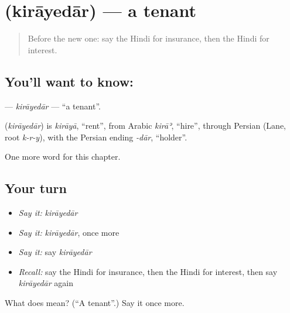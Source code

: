 \section[\texorpdfstring{\hi{किरायेदार} (kirāyedār)}{किरायेदार (kirāyedār)}]{ (kirāyedār) — a tenant}

\label{lesson:HI-C271-kirayedar}



\begin{quote}
Before the new one: say the Hindi for insurance, then the Hindi for interest.
\end{quote}

\subsection*{You'll want to know: }
\textbf{} — \emph{kirāyedār} — \textquotedblleft{}a tenant\textquotedblright{}.

\begin{cousinweb}
\textbf{} (\emph{kirāyedār}) is \emph{kirāyā}, \textquotedblleft{}rent\textquotedblright{}, from Arabic \emph{kirāʾ}, \textquotedblleft{}hire\textquotedblright{}, through Persian (Lane, root \emph{k-r-y}), with the Persian ending \emph{-dār}, \textquotedblleft{}holder\textquotedblright{}.
\end{cousinweb}

\begin{grammarlens}[title={What you've built}]
One more word for this chapter.
\end{grammarlens}

\subsection*{Your turn}
\begin{itemize}
\raggedright
  \item \emph{Say it:} \emph{kirāyedār}
  \item \emph{Say it:} \emph{kirāyedār}, once more
  \item \emph{Say it:} say \emph{kirāyedār}
  \item \emph{Recall:} say the Hindi for insurance, then the Hindi for interest, then say \emph{kirāyedār} again
\end{itemize}

\begin{tcolorbox}[breakable,colback=teal!4,colframe=teal!35!black,title={Before you move on}]
What does  mean? (\textquotedblleft{}A tenant\textquotedblright{}.) Say it once more.
\end{tcolorbox}
